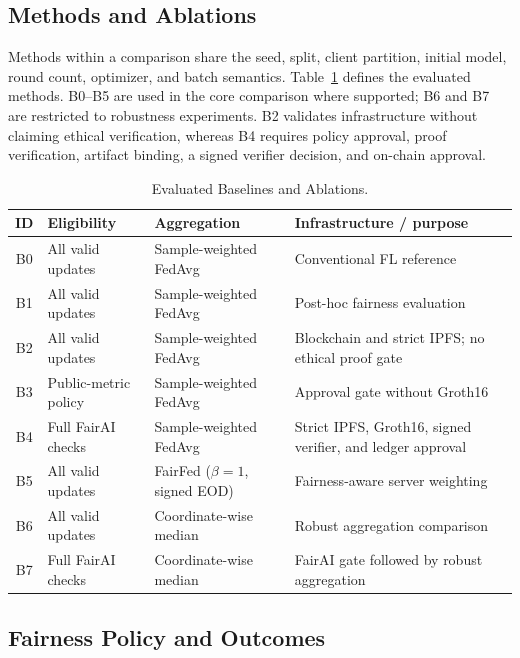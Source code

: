\documentclass[futureinternet,article,submit,pdftex,moreauthors]{Definitions/mdpi}
\begin{document}
\subsection{Methods and Ablations}

Methods within a comparison share the seed, split, client partition, initial model, round count, optimizer, and batch semantics. Table~\ref{tab:experimental-methods} defines the evaluated methods. B0--B5 are used in the core comparison where supported; B6 and B7 are restricted to robustness experiments. B2 validates infrastructure without claiming ethical verification, whereas B4 requires policy approval, proof verification, artifact binding, a signed verifier decision, and on-chain approval.

\begin{table}[htpb]
	\caption{Evaluated Baselines and Ablations.}
	\label{tab:experimental-methods}
	\centering
	\scriptsize
	\begin{tabular}{clll}
		\toprule
		\textbf{ID} & \textbf{Eligibility} & \textbf{Aggregation} & \textbf{Infrastructure / purpose} \\
		\midrule
		B0 & All valid updates & Sample-weighted FedAvg & Conventional FL reference \\
		B1 & All valid updates & Sample-weighted FedAvg & Post-hoc fairness evaluation \\
		B2 & All valid updates & Sample-weighted FedAvg & Blockchain and strict IPFS; no ethical proof gate \\
		B3 & Public-metric policy & Sample-weighted FedAvg & Approval gate without Groth16 \\
		B4 & Full FairAI checks & Sample-weighted FedAvg & Strict IPFS, Groth16, signed verifier, and ledger approval \\
		B5 & All valid updates & FairFed (\(\beta=1\), signed EOD) & Fairness-aware server weighting \\
		B6 & All valid updates & Coordinate-wise median & Robust aggregation comparison \\
		B7 & Full FairAI checks & Coordinate-wise median & FairAI gate followed by robust aggregation \\
		\bottomrule
	\end{tabular}
\end{table}

\subsection{Fairness Policy and Outcomes}
\end{document}
